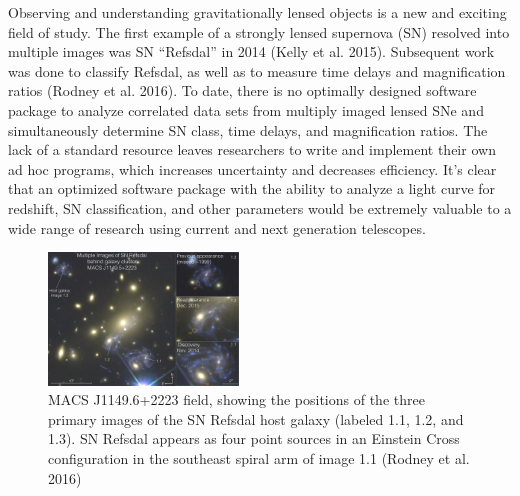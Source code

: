 \thispagestyle{fancy}
\lhead{}
\rhead{}
\renewcommand{\headrulewidth}{1pt}
\renewcommand{\footrulewidth}{0pt}
\newcommand{\packageName}{\textit{SNTD}}

\fancyfoot[C]{}

\pagestyle{fancy}

Observing and understanding gravitationally lensed objects is a new and exciting field of study. The first example of a strongly lensed supernova (SN) resolved into multiple images was SN ``Refsdal'' in 2014 (Kelly et al. 2015). Subsequent work was done to classify Refsdal, as well as to measure time delays and magnification ratios (Rodney et al. 2016). To date, there is no optimally designed software package to analyze correlated data sets from multiply imaged lensed SNe and simultaneously determine SN class, time delays, and magnification ratios. The lack of a standard resource leaves researchers to write and implement their own ad hoc programs, which increases uncertainty and decreases efficiency. It's clear that an optimized software package with the ability to analyze a light curve for redshift, SN classification, and other parameters would be extremely valuable to a wide range of research using current and next generation telescopes. 
\begin{figure}
\centering
\includegraphics[width=0.45\textwidth]{refsdal_rodney.pdf}
\caption{MACS J1149.6+2223 field, showing the positions of the three primary images of the SN Refsdal host galaxy (labeled 1.1, 1.2, and 1.3). SN Refsdal appears as four point sources in an Einstein Cross configuration in the southeast spiral arm of image 1.1 (Rodney et al. 2016)}
\end{figure}


